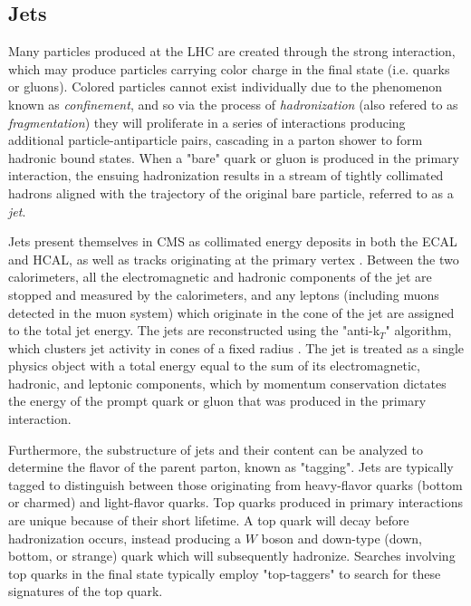 \subsection{Jets}
\label{subsec:jets}
Many particles produced at the LHC are created through the strong interaction, which may produce particles carrying color charge in the final state (i.e. quarks or gluons). Colored particles cannot exist individually due to the phenomenon known as {\it confinement}, and so via the process of {\it hadronization} (also refered to as {\it fragmentation}) they will proliferate in a series of interactions producing additional particle-antiparticle pairs, cascading in a parton shower to form hadronic bound states. When a "bare" quark or gluon is produced in the primary interaction, the ensuing hadronization results in a stream of tightly collimated hadrons aligned with the trajectory of the original bare particle, referred to as a {\it jet}. 

Jets present themselves in CMS as collimated energy deposits in both the ECAL and HCAL, as well as tracks originating at the primary vertex \cite{Schroder:2015czj}. Between the two calorimeters, all the electromagnetic and hadronic components of the jet are stopped and measured by the calorimeters, and any leptons (including muons detected in the muon system) which originate in the cone of the jet are assigned to the total jet energy. The jets are reconstructed using the "anti-k$_T$" algorithm, which clusters jet activity in cones of a fixed radius \cite{Cacciari:2008gp}. The jet is treated as a single physics object with a total energy equal to the sum of its electromagnetic, hadronic, and leptonic components, which by momentum conservation dictates the energy of the prompt quark or gluon that was produced in the primary interaction. 

Furthermore, the substructure of jets and their content can be analyzed to determine the flavor of the parent parton, known as "tagging". Jets are typically tagged to distinguish between those originating from heavy-flavor quarks (bottom or charmed) and light-flavor quarks. Top quarks produced in primary interactions are unique because of their short lifetime. A top quark will decay before hadronization occurs, instead producing a $W$ boson and down-type (down, bottom, or strange) quark which will subsequently hadronize. Searches involving top quarks in the final state typically employ "top-taggers" to search for these signatures of the top quark.

